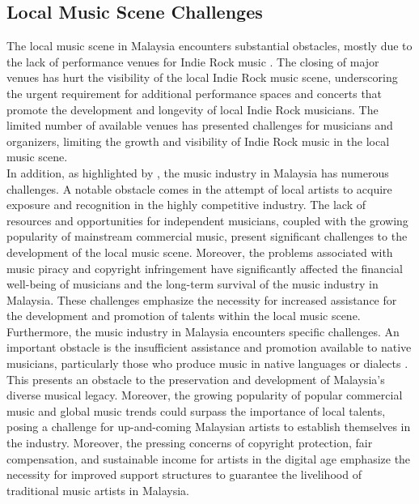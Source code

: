 \subsection{Local Music Scene Challenges}
The local music scene in Malaysia encounters substantial obstacles, mostly due to the lack of performance venues for Indie Rock music \parencite{ong19}. The closing of major venues has hurt the visibility of the local Indie Rock music scene, underscoring the urgent requirement for additional performance spaces and concerts that promote the development and longevity of local Indie Rock musicians. The limited number of available venues has presented challenges for musicians and organizers, limiting the growth and visibility of Indie Rock music in the local music scene. \\

In addition, as highlighted by \textcite{mohd21}, the music industry in Malaysia has numerous challenges. A notable obstacle comes in the attempt of local artists to acquire exposure and recognition in the highly competitive industry. The lack of resources and opportunities for independent musicians, coupled with the growing popularity of mainstream commercial music, present significant challenges to the development of the local music scene. Moreover, the problems associated with music piracy and copyright infringement have significantly affected the financial well-being of musicians and the long-term survival of the music industry in Malaysia. These challenges emphasize the necessity for increased assistance for the development and promotion of talents within the local music scene. \\

Furthermore, the music industry in Malaysia encounters specific challenges. An important obstacle is the insufficient assistance and promotion available to native musicians, particularly those who produce music in native languages or dialects \parencite{silahudin19}. This presents an obstacle to the preservation and development of Malaysia's diverse musical legacy. Moreover, the growing popularity of popular commercial music and global music trends could surpass the importance of local talents, posing a challenge for up-and-coming Malaysian artists to establish themselves in the industry. Moreover, the pressing concerns of copyright protection, fair compensation, and sustainable income for artists in the digital age emphasize the necessity for improved support structures to guarantee the livelihood of traditional music artists in Malaysia.

